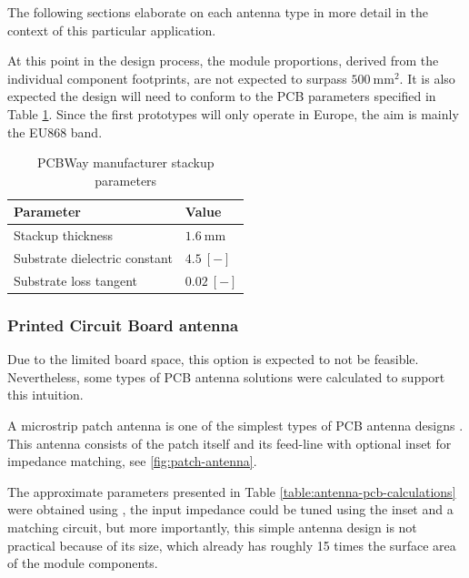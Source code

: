 The following sections elaborate on each antenna type in more detail in the context of this particular application. 

At this point in the design process, the module proportions, derived from the individual component footprints, are not expected to surpass $500~\mathrm{mm^2}$. It is also expected the design will need to conform to the PCB parameters specified in Table \ref{table:pcb-parameters}. Since the first prototypes will only operate in Europe, the aim is mainly the EU868 band.

\begin{table}[H]
\begin{center}
\caption{\label{table:pcb-parameters}PCBWay manufacturer stackup parameters \cite{pcbway_stackup_2024}}
    \begin{tabular}{|l|l|} \hline
    \textbf{Parameter}            & \textbf{Value} \\ \hline
    Stackup thickness             & $1.6~\mathrm{mm}$ \\ \hline
    Substrate dielectric constant & $4.5~\mathrm{[-]}$ \\ \hline
    Substrate loss tangent        & $0.02~\mathrm{[-]}$ \\ \hline
    \end{tabular}
\end{center}
\end{table}

\subsubsection{Printed Circuit Board antenna}
Due to the limited board space, this option is expected to not be feasible. Nevertheless, some types of PCB antenna solutions were calculated to support this intuition.

A microstrip patch antenna is one of the simplest types of PCB antenna designs \cite{zachariah_peterson_microstrip_2022,wallace_an058_nodate}. This antenna consists of the patch itself and its feed-line with optional inset for impedance matching, see \ref{fig:patch-antenna}. 

The approximate parameters presented in Table \ref{table:antenna-pcb-calculations} were obtained using \cite{zachariah_peterson_microstrip_2022}, the input impedance could be tuned using the inset and a matching circuit, but more importantly, this simple antenna design is not practical because of its size, which already has roughly 15 times the surface area of the module components.

